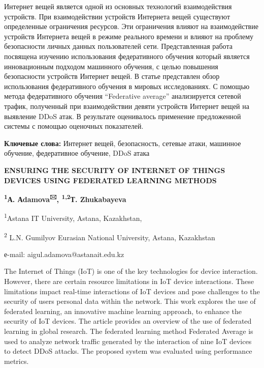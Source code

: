 Интернет вещей является одной из основных технологий взаимодействия
устройств. При взаимодействии устройств Интернета вещей существуют
определенные ограничения ресурсов. Эти ограничения влияют на
взаимодействие устройств Интернета вещей в режиме реального времени и
влияют на проблему безопасности личных данных пользователей сети.
Представленная работа посвящена изучению использования федеративного
обучения который является инновационным подходом машинного обучения, с
целью повышения безопасности устройств Интернет вещей. В статье
представлен обзор использования федеративного обучения в мировых
исследованиях. С помощью метода федеративного обучения ``Federative
average'' анализируется сетевой трафик, полученный при взаимодействии
девяти устройств Интернет вещей на выявление DDoS атак. В результате
оценивалось применение предложенной системы с помощью оценочных
показателей.

{\bfseries Ключевые слова:} Интернет вещей, безопасность, сетевые атаки,
машинное обучение, федеративное обучение, DDoS атака
\begin{center}

{\large\bfseries ENSURING THE SECURITY OF INTERNET OF THINGS DEVICES USING FEDERATED LEARNING METHODS}

{\bfseries \textsuperscript{1}А. Аdamova\textsuperscript{🖂},
\textsuperscript{1,2}Т. Zhukabayeva}

\textsuperscript{1}Astana IT University, Astana, Kazakhstan,

\textsuperscript{2} L.N. Gumilyov Eurasian National University, Astana,
Kazakhstan

е-mail: aigul.adamova@astanait.edu.kz
\end{center}

The Internet of Things (IoT) is one of the key technologies for device
interaction. However, there are certain resource limitations in IoT
device interactions. These limitations impact real-time interactions of
IoT devices and pose challenges to the security of
users\textquotesingle{} personal data within the network. This work
explores the use of federated learning, an innovative machine learning
approach, to enhance the security of IoT devices. The article provides
an overview of the use of federated learning in global research. The
federated learning method \textquotesingle Federated
Average\textquotesingle{} is used to analyze network traffic generated
by the interaction of nine IoT devices to detect DDoS attacks. The
proposed system was evaluated using performance metrics.

